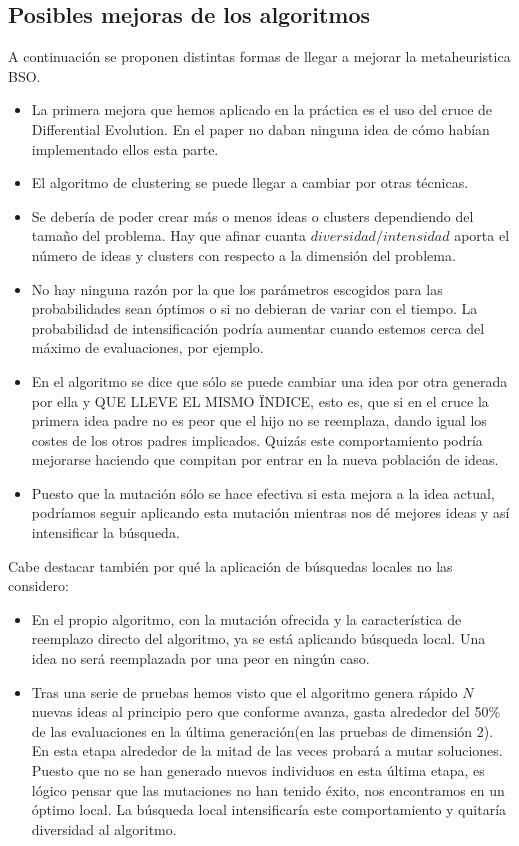 \subsection{Posibles mejoras de los algoritmos}
A continuación se proponen distintas formas de llegar a mejorar la metaheuristica BSO.
\begin{itemize}
	\item La primera mejora que hemos aplicado en la práctica es el uso del cruce de Differential Evolution. En el paper no daban ninguna idea de cómo habían implementado ellos esta parte.
	
	\item El algoritmo de clustering se puede llegar a cambiar por otras técnicas.
	
	\item Se debería de poder crear más o menos ideas o clusters dependiendo del tamaño del problema. Hay que afinar cuanta $diversidad/intensidad$ aporta el número de ideas y clusters con respecto a la dimensión del problema.
	
	\item No hay ninguna razón por la que los parámetros escogidos para las probabilidades sean óptimos o si no debieran de variar con el tiempo. La probabilidad de intensificación podría aumentar cuando estemos cerca del máximo de evaluaciones, por ejemplo.
	
	\item En el algoritmo se dice que sólo se puede cambiar una idea por otra generada por ella y QUE LLEVE EL MISMO ÏNDICE, esto es, que si en el cruce la primera idea padre no es peor que el hijo no se reemplaza, dando igual los costes de los otros padres implicados. Quizás este comportamiento podría mejorarse haciendo que compitan por entrar en la nueva población de ideas.
	
	\item Puesto que la mutación sólo se hace efectiva si esta mejora a la idea actual, podríamos seguir aplicando esta mutación mientras nos dé mejores ideas y así intensificar la búsqueda.
\end{itemize}

Cabe destacar también por qué la aplicación de búsquedas locales no las considero:

\begin{itemize}
	\item En el propio algoritmo, con la mutación ofrecida y la característica de reemplazo directo del algoritmo, ya se está aplicando búsqueda local. Una idea no será reemplazada por una peor en ningún caso. 
	
	\item Tras una serie de pruebas hemos visto que el algoritmo genera rápido $N$ nuevas ideas al principio pero que conforme avanza, gasta alrededor del 50\% de las evaluaciones en la última generación(en las pruebas de dimensión 2). En esta etapa alrededor de la mitad de las veces probará a mutar soluciones. Puesto que no se han generado nuevos individuos en esta última etapa, es lógico pensar que las mutaciones no han tenido éxito, nos encontramos en un óptimo local. La búsqueda local intensificaría este comportamiento y quitaría diversidad al algoritmo.
\end{itemize}

